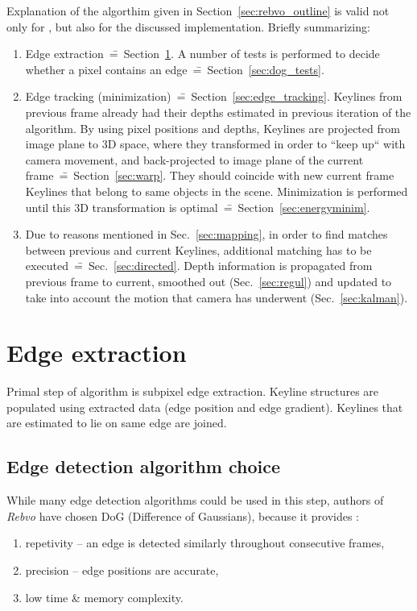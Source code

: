 Explanation of the algorthim given in Section~\ref{sec:rebvo_outline} is valid not only for \cite{jose2015realtime}, but also for the discussed implementation. Briefly summarizing:
\begin{enumerate}
	\itemsep-0em 
	\item Edge extraction~\==~Section~\ref{sec:edge_extraction}. A number of tests is performed to decide whether a pixel contains an edge~\==~Section~\ref{sec:dog_tests}.
	
	\item Edge tracking (minimization)~\==~Section~\ref{sec:edge_tracking}. Keylines from previous frame already had their depths estimated in previous iteration of the algorithm. By using pixel positions and depths, Keylines are projected from image plane to 3D space, where they transformed in order to ``keep up`` with camera movement, and back-projected to image plane of the current frame~\==~Section~\ref{sec:warp}. They should coincide with new current frame Keylines that belong to same objects in the scene. Minimization is performed until this 3D transformation is optimal~\==~Section~\ref{sec:energyminim}.
	
	\item Due to reasons mentioned in Sec.~\ref{sec:mapping}, in order to find matches between previous and current Keylines, additional matching has to be executed~\==~Sec.~\ref{sec:directed}. Depth information is propagated from previous frame to current, smoothed out (Sec.~\ref{sec:regul}) and updated to take into account the motion that camera has underwent (Sec.~\ref{sec:kalman}).
\end{enumerate}


\section{Edge extraction}
\label{sec:edge_extraction}

Primal step of algorithm is subpixel edge extraction. Keyline structures are populated using extracted data (edge position and edge gradient). Keylines that are estimated to lie on same edge are joined.

\subsection{Edge detection algorithm choice}
While many edge detection algorithms could be used in this step, authors of \textit{Rebvo} have chosen DoG (Difference of Gaussians), because it provides \cite{jose2015realtime}:
\begin{enumerate}
	\item repetivity -- an edge is detected similarly throughout consecutive frames,
	\item precision -- edge positions are accurate,
	\item low time \& memory complexity.
\end{enumerate}

